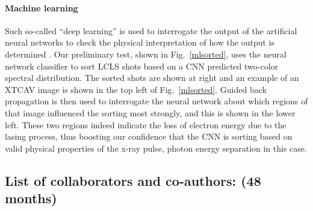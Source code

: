 \paragraph*{Machine learning}

Such so-called ``deep learning'' is used to interrogate the output of the artificial neural networks to check the physical interpretation of how the output is determined \cite{Mihir}.
Our preliminary test, shown in Fig.~\ref{mlsorted}, uses the neural network classifier to sort LCLS shots based on a CNN predicted two-color spectral distribution.
The sorted shots are shown at right and an example of an XTCAV image is shown in the top left of Fig.~\ref{mlsorted}.
Guided back propagation is then used to interrogate the neural network about which regions of that image influenced the sorting most strongly, and this is shown in the lower left.
These two regions indeed indicate the loss of electron energy due to the lasing process, thus boosting our confidence that the CNN is sorting based on valid physical properties of the x-ray pulse, photon energy separation in this case.

\subsection*{List of collaborators and co-authors: (48 months)}


